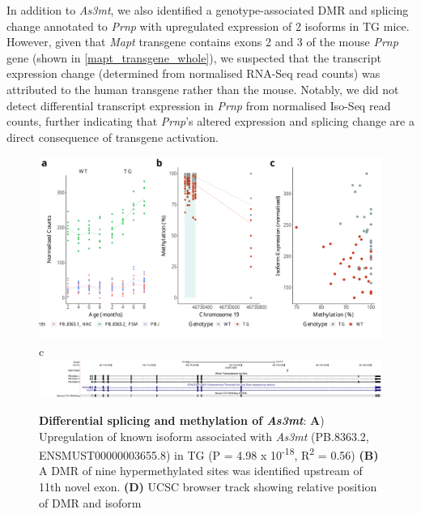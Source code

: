 In addition to \textit{As3mt}, we also identified a genotype-associated DMR and splicing change annotated to \textit{Prnp} with upregulated expression of 2 isoforms in TG mice. However, given that \textit{Mapt} transgene contains exons 2 and 3 of the mouse \textit{Prnp} gene (shown in \cref{mapt_transgene_whole}), we suspected that the transcript expression change (determined from normalised RNA-Seq read counts) was attributed to the human transgene rather than the mouse. Notably,  we did not detect differential transcript expression in \textit{Prnp} from normalised Iso-Seq read counts, further indicating that \textit{Prnp}'s altered expression and splicing change are a direct consequence of transgene activation\cite{Castanho2020}. 

\begin{figure}[htp]
	\includegraphics[page=1,scale = 0.4]{Figures/WholeDifferentialAnalysis_DMPDMR.pdf}
	\\
	\hspace*{0.2cm}\vspace{0.5cm}\large c
	\\
	\includegraphics[page=1,trim={1.5cm 0 0 0},scale = 0.9]{Figures/AS3MT_DMP.pdf}
	\captionsetup{width=0.95\textwidth}
	\caption[Differential splicing and methylation of \textit{As3mt}]%
	{\textbf{Differential splicing and methylation of \textit{As3mt}}: \textbf{A}) Upregulation of known isoform associated with \textit{As3mt} (PB.8363.2, ENSMUST00000003655.8) in TG (P = 4.98 x 10\textsuperscript{-18}, R\textsuperscript{2} = 0.56) \textbf{(B)} A DMR of nine hypermethylated sites was identified upstream of 11th novel exon. \textbf{(D)} UCSC browser track showing relative position of DMR and isoform}    
	\label{fig:IntMeth_As3mt}
\end{figure}	

